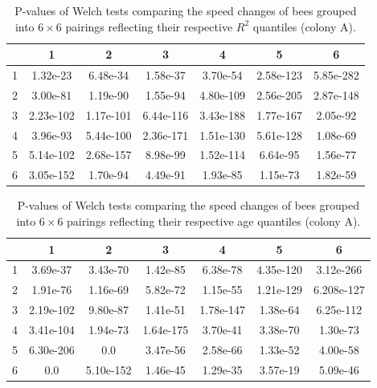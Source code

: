 \documentclass{article}
\begin{document}
\begin{table}[h!]
\centering
\def\tablename{Supplementary Table}
\caption{
P-values of Welch tests comparing the speed changes of bees grouped into $6 \times 6$ pairings reflecting their respective $R^2$ quantiles (colony A).
}
\begin{tabular}{|c|c|c|c|c|c|c|}
\hline
 & 1 & 2 & 3 & 4 & 5 & 6 \\ \hline
1 & 1.32e-23 & 6.48e-34 & 1.58e-37 & 3.70e-54 & 2.58e-123 & 5.85e-282 \\ \hline
2 & 3.00e-81 & 1.19e-90 & 1.55e-94 & 4.80e-109 & 2.56e-205 & 2.87e-148 \\ \hline
3 & 2.23e-102 & 1.17e-101 & 6.44e-116 & 3.43e-188 & 1.77e-167 & 2.05e-92 \\ \hline
4 & 3.96e-93 & 5.44e-100 & 2.36e-171 & 1.51e-130 & 5.61e-128 & 1.08e-69 \\ \hline
5 & 5.14e-102 & 2.68e-157 & 8.98e-99 & 1.52e-114 & 6.64e-95 & 1.56e-77 \\ \hline
6 & 3.05e-152 & 1.70e-94 & 4.49e-91 & 1.93e-85 & 1.15e-73 & 1.82e-59 \\ \hline
\end{tabular}
\end{table}


\begin{table}[h!]
\centering
\def\tablename{Supplementary Table}
\caption{
P-values of Welch tests comparing the speed changes of bees grouped into $6 \times 6$ pairings reflecting their respective age quantiles (colony A).
}
\begin{tabular}{|c|c|c|c|c|c|c|}
\hline
 & 1 & 2 & 3 & 4 & 5 & 6 \\ \hline
1 & 3.69e-37 & 3.43e-70 & 1.42e-85 & 6.38e-78 & 4.35e-120 & 3.12e-266 \\ \hline
2 & 1.91e-76 & 1.16e-69 & 5.82e-72 & 1.15e-55 & 1.21e-129 & 6.208e-127 \\ \hline
3 & 2.19e-102 & 9.80e-87 & 1.41e-51 & 1.78e-147 & 1.38e-64 & 6.25e-112 \\ \hline
4 & 3.41e-104 & 1.94e-73 & 1.64e-175 & 3.70e-41 & 3.38e-70 & 1.30e-73 \\ \hline
5 & 6.30e-206 & 0.0 & 3.47e-56 & 2.58e-66 & 1.33e-52 & 4.00e-58 \\ \hline
6 & 0.0 & 5.10e-152 & 1.46e-45 & 1.29e-35 & 3.57e-19 & 5.09e-46 \\ \hline
\end{tabular}
\end{table}

\clearpage
\end{document}

